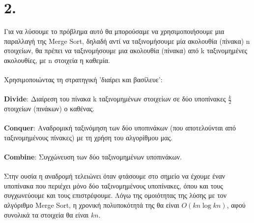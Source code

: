 \documentclass{article}
\begin{document}
\section*{2.}
Για να λύσουμε το πρόβλημα αυτό θα μπορούσαμε να χρησιμοποιήσουμε μια παραλλαγή της \textlatin{Merge Sort}, δηλαδή αντί να ταξινομήσουμε μία ακολουθία (πίνακα) \textlatin{n} στοιχείων,
θα πρέπει να ταξινομήσουμε μια ακολουθία (πίνακα) από \textlatin{k} ταξινομημένες ακολουθίες, με \textlatin{n} στοιχεία η καθεμία.\\\\
Χρησιμοποιώντας τη στρατηγική 'διαίρει και βασίλευε':\\\\
\textlatin{\textbf{Divide}}: Διαίρεση του πίνακα \textlatin{k} ταξινομημένων στοιχείων σε δύο υποπίνακες $\frac{k}{2}$ στοιχείων (πινάκων) ο καθένας.\\\\
\textlatin{\textbf{Conquer}}: Αναδρομική ταξινόμηση των δύο υποπινάκων (που αποτελούνται από ταξινομημένους πίνακες) με τη χρήση του αλγορίθμου μας.\\\\
\textlatin{\textbf{Combine}}: Συγχώνευση των δύο ταξινομημένων υποπινάκων.\\\\
Στην ουσία η αναδρομή τελειώνει όταν φτάσουμε στο σημείο να έχουμε έναν υποπίνακα που περιέχει μόνο δύο ταξινομημένους υποπίνακες, όπου και τους συγχωνεύουμε και τους επιστρέφουμε.
Λόγω της ομοιότητας της λύσης με τον αλγόριθμο \textlatin{Merge Sort}, η χρονική πολυποκότητά της θα είναι $O(kn\log{kn})$, αφού συνολικά τα στοιχεία θα είναι $kn$.
\end{document}

